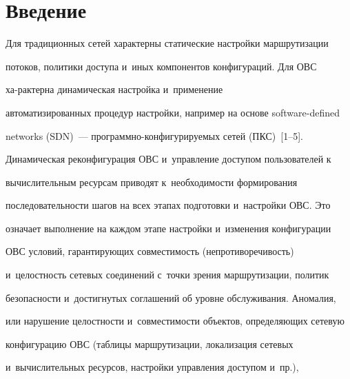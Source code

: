 















      \thispagestyle{headings}


   


\section{Введение}





   Для традиционных сетей характерны статические настройки маршрутизации 


потоков, политики доступа и~иных компонентов конфигураций. Для ОВС 


ха-\linebreak рак\-терна динамическая настройка и~применение 


автоматизированных процедур настройки, например на основе software-defined 


networks (SDN)~--- про\-грам\-мно-кон\-фи\-гу\-ри\-ру\-емых сетей (ПКС)~[1--5].


   


   Динамическая реконфигурация ОВС и~управление доступом пользователей к~


вычислительным ресурсам приводят к~необходимости формирования 


последовательности шагов на всех этапах подготовки и~настройки ОВС. Это 


означает выполнение на каждом этапе настройки и~изменения конфигурации 


ОВС условий, гарантирующих совместимость (непротиворечивость) 


и~целостность сетевых соединений с~точки зрения маршрутизации, политик 


безопасности и~достигнутых соглашений об уровне обслуживания. Аномалия, 


или нарушение целостности и~совместимости объектов, определяющих сетевую 


конфигурацию ОВС (таблицы маршрутизации, локализация сетевых 


и~вычислительных ресурсов, настройки управления доступом и~пр.), 


